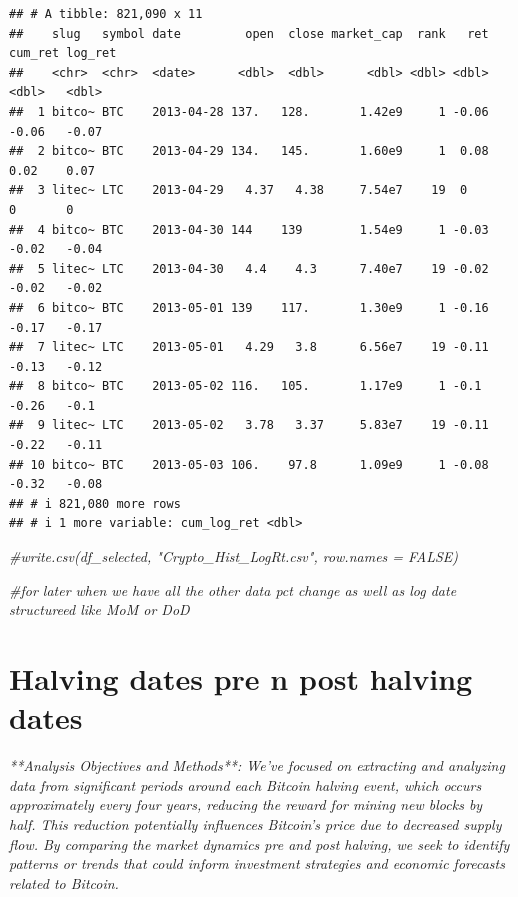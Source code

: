 \documentclass[
]{article}
\newenvironment{Shaded}{\begin{snugshade}}{\end{snugshade}}
\newcommand{\CommentTok}[1]{\textcolor[rgb]{0.56,0.35,0.01}{\textit{#1}}}
\begin{document}
\begin{verbatim}
## # A tibble: 821,090 x 11
##    slug   symbol date         open  close market_cap  rank   ret cum_ret log_ret
##    <chr>  <chr>  <date>      <dbl>  <dbl>      <dbl> <dbl> <dbl>   <dbl>   <dbl>
##  1 bitco~ BTC    2013-04-28 137.   128.       1.42e9     1 -0.06   -0.06   -0.07
##  2 bitco~ BTC    2013-04-29 134.   145.       1.60e9     1  0.08    0.02    0.07
##  3 litec~ LTC    2013-04-29   4.37   4.38     7.54e7    19  0       0       0   
##  4 bitco~ BTC    2013-04-30 144    139        1.54e9     1 -0.03   -0.02   -0.04
##  5 litec~ LTC    2013-04-30   4.4    4.3      7.40e7    19 -0.02   -0.02   -0.02
##  6 bitco~ BTC    2013-05-01 139    117.       1.30e9     1 -0.16   -0.17   -0.17
##  7 litec~ LTC    2013-05-01   4.29   3.8      6.56e7    19 -0.11   -0.13   -0.12
##  8 bitco~ BTC    2013-05-02 116.   105.       1.17e9     1 -0.1    -0.26   -0.1 
##  9 litec~ LTC    2013-05-02   3.78   3.37     5.83e7    19 -0.11   -0.22   -0.11
## 10 bitco~ BTC    2013-05-03 106.    97.8      1.09e9     1 -0.08   -0.32   -0.08
## # i 821,080 more rows
## # i 1 more variable: cum_log_ret <dbl>
\end{verbatim}

\begin{Shaded}
\begin{Highlighting}[]
\CommentTok{\#write.csv(df\_selected, "Crypto\_Hist\_LogRt.csv", row.names = FALSE)}
\end{Highlighting}
\end{Shaded}

\begin{Shaded}
\begin{Highlighting}[]
\CommentTok{\#for later when we have all the other data pct change as well as log date structureed like MoM or DoD}
\end{Highlighting}
\end{Shaded}

\hypertarget{halving-dates-pre-n-post-halving-dates}{%
\section{Halving dates pre n post halving
dates}\label{halving-dates-pre-n-post-halving-dates}}

\emph{**Analysis Objectives and Methods**: We've focused on extracting
and analyzing data from significant periods around each Bitcoin halving
event, which occurs approximately every four years, reducing the reward
for mining new blocks by half. This reduction potentially influences
Bitcoin's price due to decreased supply flow. By comparing the market
dynamics pre and post halving, we seek to identify patterns or trends
that could inform investment strategies and economic forecasts related
to Bitcoin.}
\end{document}
